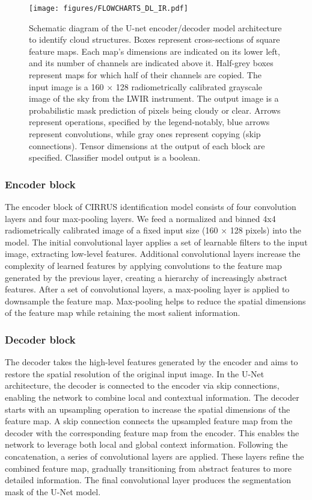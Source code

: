 \documentclass{article}
\begin{document}
\begin{figure}[!h]
	\texttt{[image: figures/FLOWCHARTS\_DL\_IR.pdf]}
	\caption{
		Schematic diagram of the U-net encoder/decoder model architecture to identify cloud structures. Boxes represent cross-sections of square feature maps. Each map's dimensions are indicated on its lower left, and its number of channels are indicated above it. Half-grey boxes represent maps for which half of their channels are copied. The input image is a 160 × 128 radiometrically calibrated grayscale image of the sky from the LWIR instrument. The output image is a probabilistic mask prediction of pixels being cloudy or clear. Arrows represent operations, specified by the legend-notably, blue arrows represent convolutions, while gray ones represent copying (skip connections). 	Tensor dimensions at the output of each block are specified. Classifier model output is a boolean. \label{fig1}}
	\end{figure}
	\unskip

\subsubsection{Encoder block}

The encoder block of CIRRUS identification model consists of four convolution layers and four max-pooling layers. We feed a normalized and binned 4x4 radiometrically calibrated image of a fixed input size (160 × 128 pixels) into the model.
The initial convolutional layer applies a set of learnable filters to the input image, extracting low-level features. Additional convolutional layers increase the complexity of learned features by applying convolutions to the feature map generated by the previous layer, creating a hierarchy of increasingly abstract features. After a set of convolutional layers, a max-pooling layer is applied to downsample the feature map. Max-pooling helps to reduce the spatial dimensions of the feature map while retaining the most salient information.

\subsubsection{Decoder block}

The decoder takes the high-level features generated by the encoder and aims to restore the spatial resolution of the original input image. In the U-Net architecture, the decoder is connected to the encoder via skip connections, enabling the network to combine local and contextual information. The decoder starts with an upsampling operation to increase the spatial dimensions of the feature map. A skip connection connects the upsampled feature map from the decoder with the corresponding feature map from the encoder. This enables the network to leverage both local and global context information. Following the concatenation, a series of convolutional layers are applied. These layers refine the combined feature map, gradually transitioning from abstract features to more detailed information. The final convolutional layer produces the segmentation mask of the U-Net model.
\end{document}
